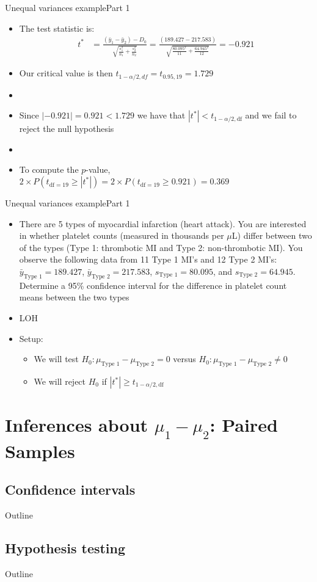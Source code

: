 \documentclass[xcolor=dvipsnames]{beamer}
\begin{document}
\begin{frame}{Unequal variances example}{Part 1}
\begin{itemize}
	\item The test statistic is: 
	\begin{align*}
	t^* &= \frac{(\bar{y}_1-\bar{y}_2)-D_0}{\sqrt{\frac{s^2_1}{n_1}+\frac{s^2_2}{n_2}}} = \frac{(189.427-217.583)}{\sqrt{\frac{80.095^2}{11}+\frac{64.945^2}{12}}} = -0.921
	\end{align*}
	\item Our critical value is then $t_{1-\alpha/2, df} = t_{0.95, 19} = 1.729$
	\item[]
	\item Since $|-0.921| = 0.921 < 1.729$ we have that $|t^*| < t_{1-\alpha / 2, \text{df}}$ and we fail to reject the null hypothesis 
	\item[]
	\item To compute the $p$-value, $2 \times P(t_{\text{df} = 19} \geq |t^*|) = 2\times P(t_{\text{df} = 19} \geq 0.921) = 0.369$
\end{itemize}
\end{frame}

\begin{frame}{Unequal variances example}{Part 1}
\begin{itemize}
	\item There are 5 types of myocardial infarction (heart attack). You are interested in whether platelet counts (measured in thousands per $\mu$L) differ between two of the types (Type 1: thrombotic MI and Type 2: non-thrombotic MI). You observe the following data from 11 Type 1 MI's and 12 Type 2 MI's: $\bar{y}_{\text{Type 1}}=189.427$, $\bar{y}_{\text{Type 2}}=217.583$, $s_{\text{Type 1}} = 80.095$, and $s_{\text{Type 2}} = 64.945$. Determine a 95\% confidence interval for the difference in platelet count means between the two types
	\item[] LOH
	\item Setup:
	\begin{itemize}
		\item We will test $H_0: \mu_{\text{Type 1}} - \mu_{\text{Type 2}} =0$ versus $H_0: \mu_{\text{Type 1}} - \mu_{\text{Type 2}} \neq 0$
		\item We will reject $H_0$ if $|t^*| \geq t_{1-\alpha / 2, \text{df}}$
	\end{itemize}
\end{itemize}
\end{frame}

\section{Inferences about $\mu_1 - \mu_2$: Paired Samples}
\subsection{Confidence intervals}
\begin{frame}{Outline}
\tableofcontents[currentsection,subsectionstyle=show/shaded/hide]
\end{frame}

\subsection{Hypothesis testing}
\begin{frame}{Outline}
\tableofcontents[currentsection,subsectionstyle=show/shaded/hide]
\end{frame}
\end{document}
